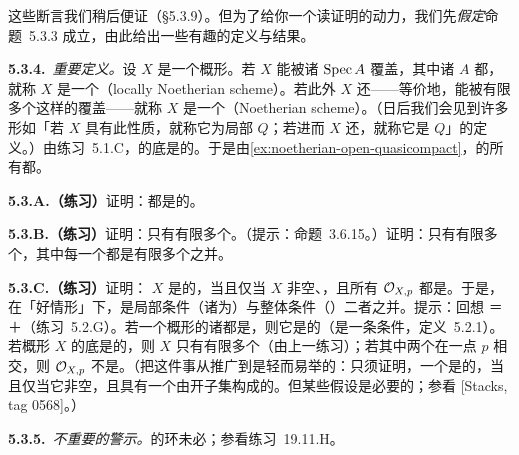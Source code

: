 这些断言我们稍后便证（\S5.3.9）。但为了给你一个读证明的动力，我们先\emph{假定}命题~5.3.3 成立，由此给出一些有趣的定义与结果。

\textbf{5.3.4.}\ \emph{重要定义。}\quad 设 $X$ 是一个概形。若 $X$ 能被诸\trAffine\trOpenSet{} $\operatorname{Spec} A$ 覆盖，其中诸 $A$ 都\trNoetherian，就称 $X$ 是一个\textbf{\trLocally\trNoetherian{}\trScheme}（locally Noetherian scheme）。若此外 $X$ 还\trQuasicompact——等价地，能被有限多个这样的\trAffine\trOpenSet{}覆盖——就称 $X$ 是一个\textbf{\trNoetherian{}\trScheme}（Noetherian scheme）。（日后我们会见到许多形如「若 $X$ 具有此性质，就称它为局部 $Q$；若进而 $X$ 还\trQuasicompact，就称它是 $Q$」的定义。）由练习~5.1.C，\trNoetherian{}\trScheme{}的底\trTopologicalSpace{}是\trNoetherian{}的。于是由\cref{ex:noetherian-open-quasicompact}，\trNoetherian{}\trScheme{}的所有\trOpenSubset{}都\trQuasicompact。

\textbf{5.3.A.（练习）}\quad 证明：\trLocally\trNoetherian{}\trScheme{}都是\trQuasiSeparated{}的。

\textbf{5.3.B.（练习）}\quad 证明：\trNoetherian{}\trScheme{}只有有限多个\trIrreducibleComponent。（提示：命题~3.6.15。）证明：\trNoetherian{}\trScheme{}只有有限多个\trConnectedComponent，其中每一个都是有限多个\trIrreducibleComponent{}之并。

\textbf{5.3.C.（练习）}\quad 证明：\trNoetherian{}\trScheme{} $X$ 是\trIntegral{}的，当且仅当 $X$ 非空、\trConnected，且所有\trStalk{} $\mathcal{O}_{X,p}$ 都是\trIntegralDomain。于是，在「好情形」下，\trIntegrality{}是局部条件（诸\trStalk{}为\trIntegralDomain）与整体条件（\trConnected）二者之并。提示：回想 \trIntegral{}＝\trIrreducible{}＋\trReduced（练习~5.2.G）。若一个概形的诸\trStalk{}都是\trIntegralDomain，则它是\trReduced{}的（\trReducedness{}是一条\trStalkLocal{}条件，定义~5.2.1）。若概形 $X$ 的底\trTopologicalSpace{}是\trNoetherian{}的，则 $X$ 只有有限多个\trIrreducibleComponent{}（由上一练习）；若其中两个在一点 $p$ 相交，则 $\mathcal{O}_{X,p}$ 不是\trIntegralDomain。（把这件事从\trNoetherian{}\trScheme{}推广到\trLocally\trNoetherian{}\trScheme{}是轻而易举的：只须证明，一个\trConnected{}\trScheme{}是\trIrreducible{}的，当且仅当它非空，且具有一个由开\trIrreducible{}子集构成的\trCover。但某些\trNoetherian{}假设是必要的；参看 [Stacks, tag 0568]。）

\textbf{5.3.5.}\ \emph{不重要的警示。}\quad \trNoetherian{}\trScheme{}的\trGlobalSections{}环未必\trNoetherian；参看练习~19.11.H。

